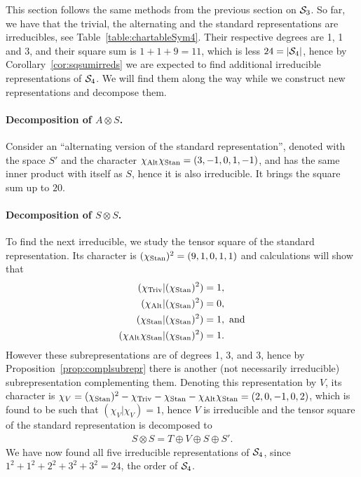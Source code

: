 \begin{example}
	This section follows the same methods from the previous section on $\mathcal{S}_3$. So far, we have that the trivial, the alternating and the standard representations are irreducibles, see Table~\ref{table:chartableSym4}. Their respective degrees are 1, 1 and 3, and their square sum is $1+1+9 = 11$, which is less $24 = |\mathcal{S}_4|$, hence by Corollary~\ref{cor:sqsumirreds} we are expected to find additional irreducible representations of $\mathcal{S}_4$. We will find them along the way while we construct new representations and decompose them.
	
	\paragraph{Decomposition of $A \otimes S$.} Consider an ``alternating version of the standard representation'', denoted with the space $S'$ and the character $\chi_{\text{Alt}}\chi_{\text{Stan}} = (3,-1,0,1,-1)$, and has the same inner product with itself as $S$, hence it is also irreducible. It brings the square sum up to $20$.
	
	\paragraph{Decomposition of $S \otimes S$.} To find the next irreducible, we study the tensor square of the standard representation. Its character is $(\chi_{\text{Stan}})^2 = (9,1,0,1,1)$ and calculations will show that
	\begin{align*}
		(\chi_{\text{Triv}} | (\chi_{\text{Stan}})^2) & = 1, \\
		(\chi_{\text{Alt}} | (\chi_{\text{Stan}})^2)  &= 0, \\
		(\chi_{\text{Stan}} | (\chi_{\text{Stan}})^2)  &= 1, \text{ and} \\
		(\chi_{\text{Alt}}\chi_{\text{Stan}} | (\chi_{\text{Stan}})^2)  &= 1.
	\end{align*}
	However these subrepresentations are of degrees 1, 3, and 3, hence by Proposition~\ref{prop:complsubrepr} there is another (not necessarily irreducible) subrepresentation complementing them. Denoting this representation by $V$, its character is $\chi_V = (\chi_{\text{Stan}})^2 - \chi_{\text{Triv}} - \chi_{\text{Stan}} - \chi_{\text{Alt}}\chi_{\text{Stan}} = (2,0,-1,0,2)$, which is found to be such that $(\chi_V|\chi_V) = 1$, hence $V$ is irreducible and  the tensor square of the standard representation is decomposed to 
	\begin{align*}
		S  \otimes S = T \oplus V \oplus S \oplus S'.
	\end{align*}
	We have now found all five irreducible representations of $\mathcal{S}_4$, since $1^2 + 1^2 +  2^2 + 3^2 + 3^2 = 24$, the order of $\mathcal{S}_4$.
	

\end{example}
